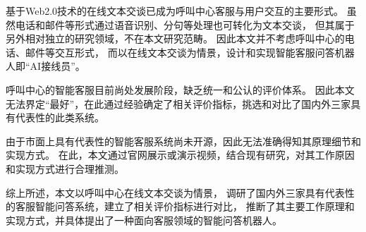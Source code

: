 基于Web2.0技术的在线文本交谈已成为呼叫中心客服与用户交互的主要形式。
虽然电话和邮件等形式通过语音识别、分句等处理也可转化为文本交谈，
但其属于另外相对独立的研究领域，不在本文研究范畴。
因此本文并不考虑呼叫中心的电话、邮件等交互形式，
而以在线文本交谈为情景，设计和实现智能客服问答机器人即“AI接线员”。

呼叫中心的智能客服目前尚处发展阶段，缺乏统一和公认的评价体系。
因此本文无法界定“最好”，在此通过经验确定了相关评价指标，挑选和对比了国内外三家具有代表性的此类系统。

由于市面上具有代表性的智能客服系统尚未开源，因此无法准确得知其原理细节和实现方式。
在此，本文通过官网展示或演示视频，结合现有研究，对其工作原因和实现方式进行合理推测。

综上所述，本文以呼叫中心在线文本交谈为情景，
调研了国内外三家具有代表性的客服智能问答系统，建立了相关评价指标进行对比，
推断了其主要工作原理和实现方式，并具体提出了一种面向客服领域的智能问答机器人。
